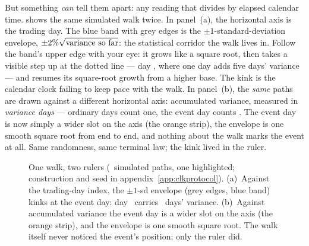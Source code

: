 But something \emph{can} tell them apart: any reading that divides by
elapsed calendar time.   shows the same simulated
walk twice.  In panel~(a), the horizontal axis is the trading day.
The blue band with grey edges is the $\pm1$-standard-deviation
envelope, $\pm2\%\sqrt{\text{variance so far}}$:
the statistical corridor the walk lives in.  Follow the band's upper edge
with your eye: it grows like a square root, then takes a visible
step up at the dotted line --- day \MacClkWalkEventDay, where one
day adds five days' variance --- and resumes its square-root growth
from a higher base.  The kink is the calendar clock failing to keep
pace with the walk.  In panel~(b), the \emph{same} paths are drawn
against a different horizontal axis: accumulated variance, measured
in \emph{variance days} --- ordinary days count one, the event day
counts \MacClkWalkEventUnits.  The event day is now simply a wider
slot on the axis (the orange strip), the envelope is one smooth
square root from end to end, and nothing about the walk marks the
event at all.  Same randomness, same terminal law; the kink lived in
the ruler.

\begin{figure}[htbp]
\centering
{}
\caption{One walk, two rulers (\MacClkWalkPaths\ simulated paths, one
highlighted; construction and seed in
appendix~\ref{app:clkprotocol}).  (a)~Against the trading-day index,
the $\pm1$-sd envelope (grey edges, blue band) kinks at the event
day: day \MacClkWalkEventDay\ carries \MacClkWalkEventUnits\ days'
variance.  (b)~Against accumulated variance the event day is a wider
slot on the axis (the orange strip), and the envelope is one smooth
square root.  The walk itself never noticed the event's position;
only the ruler did.}
\label{fig:clkwalk}
\end{figure}

